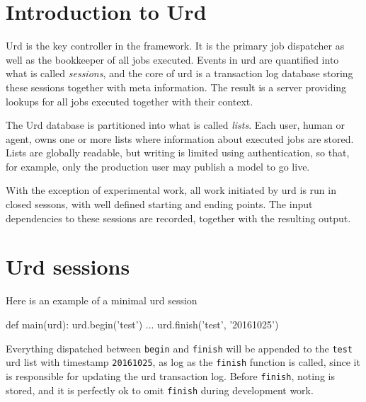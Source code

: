 \section{Introduction to Urd}

Urd is the key controller in the framework.  It is the primary job
dispatcher as well as the bookkeeper of all jobs executed.  Events in
urd are quantified into what is called \textsl{sessions}, and the core
of urd is a transaction log database storing these sessions together
with meta information.  The result is a server providing lookups for
all jobs executed together with their context.

The Urd database is partitioned into what is called \textsl{lists}.
Each user, human or agent, owns one or more lists where information
about executed jobs are stored.  Lists are globally readable, but
writing is limited using authentication, so that, for example, only
the production user may publish a model to go live.

With the exception of experimental work, all work initiated by urd is
run in closed sessons, with well defined starting and ending points.
The input dependencies to these sessions are recorded, together with
the resulting output.



\section{Urd sessions}

Here is an example of a minimal urd session\\
\begin{python}
def main(urd):
  urd.begin('test')
  ...
  urd.finish('test', '20161025')
\end{python}
Everything dispatched between \texttt{begin} and \texttt{finish} will
be appended to the \texttt{test} urd list with timestamp
\texttt{20161025}, as log as the \texttt{finish} function is called,
since it is responsible for updating the urd transaction log.  Before
\texttt{finish}, noting is stored, and it is perfectly ok to omit
\texttt{finish} during development work.

